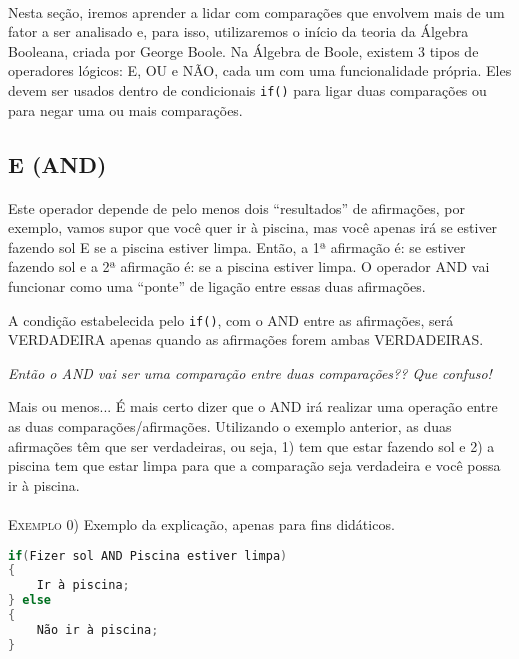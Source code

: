     \paragraph{}
    Nesta seção, iremos aprender a lidar com comparações que envolvem mais de um fator a ser analisado e, para isso, utilizaremos o início da teoria da Álgebra Booleana, criada por George Boole. Na Álgebra de Boole, existem 3 tipos de operadores lógicos: E, OU e NÃO, cada um com uma funcionalidade própria. Eles devem ser usados dentro de condicionais \lstinline[columns=fixed]{if()} para ligar duas comparações ou para negar uma ou mais comparações.
 
\subsection{E (AND)}
 
    \paragraph{}
    Este operador depende de pelo menos dois ``resultados'' de afirmações, por exemplo, vamos supor que você quer ir à piscina, mas você apenas irá se estiver fazendo sol E se a piscina estiver limpa. Então, a 1ª afirmação é: se estiver fazendo sol e a 2ª afirmação é: se a piscina estiver limpa. O operador AND vai funcionar como uma ``ponte'' de ligação entre essas duas afirmações. 
    
    \begin{center}
        A condição estabelecida pelo \lstinline[columns=fixed]{if()}, com o AND entre as afirmações, será VERDADEIRA apenas quando as afirmações forem ambas VERDADEIRAS.
    \end{center}
    
    \textit{Então o AND vai ser uma comparação entre duas comparações?? Que confuso!} \par
    Mais ou menos... É mais certo dizer que o AND irá realizar uma operação entre as duas comparações/afirmações. Utilizando o exemplo anterior, as duas afirmações têm que ser verdadeiras, ou seja, 1) tem que estar fazendo sol e 2) a piscina tem que estar limpa para que a comparação seja verdadeira e você possa ir à piscina.
    \\~\\
    \textsc{Exemplo 0)} Exemplo da explicação, apenas para fins didáticos.
    \begin{lstlisting}[language=C]
if(Fizer sol AND Piscina estiver limpa)
{
    Ir à piscina;
} else 
{
    Não ir à piscina;
}
\end{lstlisting}


